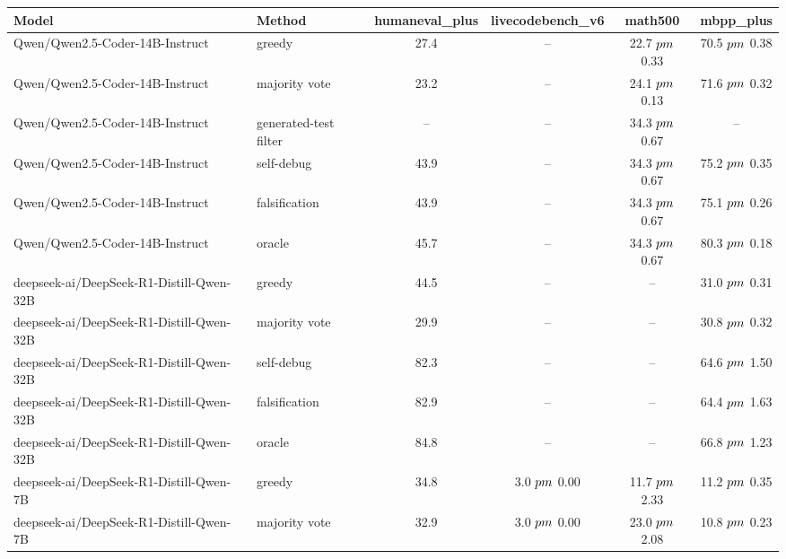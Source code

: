 \begin{tabular}{llcccc}
\toprule
Model & Method & humaneval_plus & livecodebench_v6 & math500 & mbpp_plus \\
\midrule
Qwen/Qwen2.5-Coder-14B-Instruct & greedy & 27.4 & -- & 22.7 $\\pm$ 0.33 & 70.5 $\\pm$ 0.38 \\
Qwen/Qwen2.5-Coder-14B-Instruct & majority vote & 23.2 & -- & 24.1 $\\pm$ 0.13 & 71.6 $\\pm$ 0.32 \\
Qwen/Qwen2.5-Coder-14B-Instruct & generated-test filter & -- & -- & 34.3 $\\pm$ 0.67 & -- \\
Qwen/Qwen2.5-Coder-14B-Instruct & self-debug & 43.9 & -- & 34.3 $\\pm$ 0.67 & 75.2 $\\pm$ 0.35 \\
Qwen/Qwen2.5-Coder-14B-Instruct & falsification & 43.9 & -- & 34.3 $\\pm$ 0.67 & 75.1 $\\pm$ 0.26 \\
Qwen/Qwen2.5-Coder-14B-Instruct & oracle & 45.7 & -- & 34.3 $\\pm$ 0.67 & 80.3 $\\pm$ 0.18 \\
deepseek-ai/DeepSeek-R1-Distill-Qwen-32B & greedy & 44.5 & -- & -- & 31.0 $\\pm$ 0.31 \\
deepseek-ai/DeepSeek-R1-Distill-Qwen-32B & majority vote & 29.9 & -- & -- & 30.8 $\\pm$ 0.32 \\
deepseek-ai/DeepSeek-R1-Distill-Qwen-32B & self-debug & 82.3 & -- & -- & 64.6 $\\pm$ 1.50 \\
deepseek-ai/DeepSeek-R1-Distill-Qwen-32B & falsification & 82.9 & -- & -- & 64.4 $\\pm$ 1.63 \\
deepseek-ai/DeepSeek-R1-Distill-Qwen-32B & oracle & 84.8 & -- & -- & 66.8 $\\pm$ 1.23 \\
deepseek-ai/DeepSeek-R1-Distill-Qwen-7B & greedy & 34.8 & 3.0 $\\pm$ 0.00 & 11.7 $\\pm$ 2.33 & 11.2 $\\pm$ 0.35 \\
deepseek-ai/DeepSeek-R1-Distill-Qwen-7B & majority vote & 32.9 & 3.0 $\\pm$ 0.00 & 23.0 $\\pm$ 2.08 & 10.8 $\\pm$ 0.23 \\

\end{tabular}

